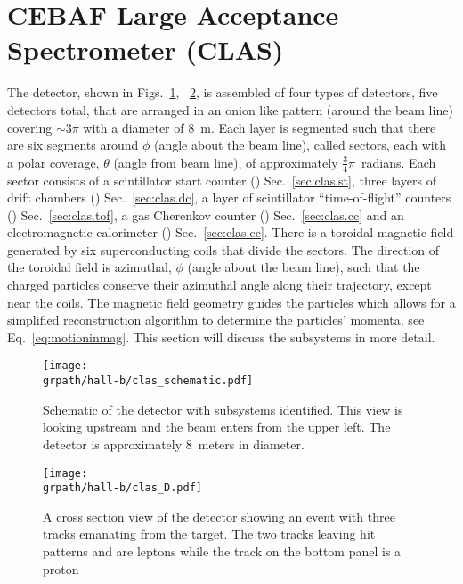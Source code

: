 \section{CEBAF Large Acceptance Spectrometer (CLAS)} \label{sec:tjnaf.clas}

The  detector, shown in Figs.~\ref{fig:clas}, ~\ref{fig:clas.ced}, is assembled of four types of detectors, five detectors total,  that are arranged in an onion like pattern (around the beam line) covering $\sim 3\pi$ with a diameter of 8~m. Each layer is segmented such that there are six segments around $\phi$ (angle about the beam line), called sectors, each with a polar coverage, $\theta$ (angle from beam line), of approximately $\frac{3}{4}\pi$~radians. Each sector consists of a scintillator start counter () Sec.~\ref{sec:clas.st}, three layers of drift chambers () Sec.~\ref{sec:clas.dc}, a layer of scintillator ``time-of-flight'' counters () Sec.~\ref{sec:clas.tof}, a gas Cherenkov counter () Sec.~\ref{sec:clas.cc} and an electromagnetic calorimeter () Sec.~\ref{sec:clas.ec}. There is a toroidal magnetic field generated by six superconducting coils that divide the sectors. The direction of the toroidal field is azimuthal, $\phi$ (angle about the beam line), such that the charged particles conserve their azimuthal angle along their trajectory, except near the coils. The magnetic field geometry guides the particles which allows for a simplified reconstruction algorithm to determine the particles' momenta, see Eq.~\ref{eq:motioninmag}. This section will discuss the subsystems in more detail.


\begin{figure}\begin{center}
\texttt{[image: \\grpath/hall-b/clas\_schematic.pdf]}
\caption[Schematic of the  detector with subsystems identified]{\label{fig:clas}{}Schematic of the  detector\cite{clas} with subsystems identified. This view is looking upstream and the beam enters from the upper left. The detector is approximately 8~meters in diameter.}
\end{center}\end{figure}

\begin{figure}\begin{center}
\texttt{[image: \\grpath/hall-b/clas\_D.pdf]}
\caption[A cross section view of the  detector showing an event with three tracks emanating from the target]{\label{fig:clas.ced}A cross section view of the  detector showing an event with three tracks emanating from the target. The two tracks leaving hit patterns  and  are leptons while the track on the bottom panel is a proton}
\end{center}\end{figure}

